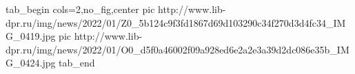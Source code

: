  
 
 
 
 


\ifcmt
  tab_begin cols=2,no_fig,center
     pic http://www.lib-dpr.ru/img/news/2022/01/Z0_5b124c9f3fd1867d69d103290c34f270d3d4fc34_IMG_0419.jpg
		 pic http://www.lib-dpr.ru/img/news/2022/01/O0_d5f0a46002f09a928ed6e2a2e3a39d2dc086e35b_IMG_0424.jpg
  tab_end
\fi
